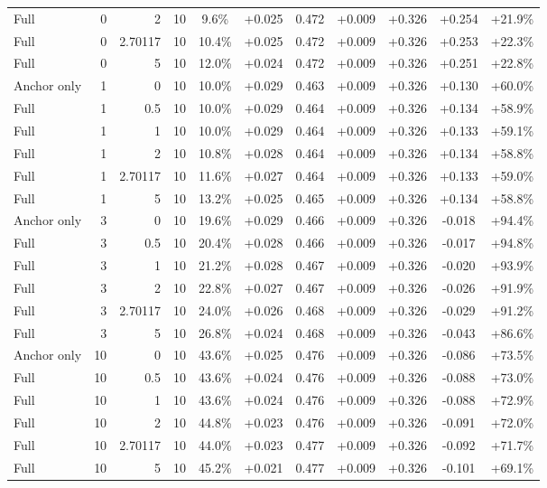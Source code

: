 \begin{table}[htbp]
\begin{tabular}{lrrrccccccc}
Full & 0 & 2 & 10 & 9.6\% & +0.025 & 0.472 & +0.009 & +0.326 & +0.254 & +21.9\% \\
Full & 0 & 2.70117 & 10 & 10.4\% & +0.025 & 0.472 & +0.009 & +0.326 & +0.253 & +22.3\% \\
Full & 0 & 5 & 10 & 12.0\% & +0.024 & 0.472 & +0.009 & +0.326 & +0.251 & +22.8\% \\
Anchor only & 1 & 0 & 10 & 10.0\% & +0.029 & 0.463 & +0.009 & +0.326 & +0.130 & +60.0\% \\
Full & 1 & 0.5 & 10 & 10.0\% & +0.029 & 0.464 & +0.009 & +0.326 & +0.134 & +58.9\% \\
Full & 1 & 1 & 10 & 10.0\% & +0.029 & 0.464 & +0.009 & +0.326 & +0.133 & +59.1\% \\
Full & 1 & 2 & 10 & 10.8\% & +0.028 & 0.464 & +0.009 & +0.326 & +0.134 & +58.8\% \\
Full & 1 & 2.70117 & 10 & 11.6\% & +0.027 & 0.464 & +0.009 & +0.326 & +0.133 & +59.0\% \\
Full & 1 & 5 & 10 & 13.2\% & +0.025 & 0.465 & +0.009 & +0.326 & +0.134 & +58.8\% \\
Anchor only & 3 & 0 & 10 & 19.6\% & +0.029 & 0.466 & +0.009 & +0.326 & -0.018 & +94.4\% \\
Full & 3 & 0.5 & 10 & 20.4\% & +0.028 & 0.466 & +0.009 & +0.326 & -0.017 & +94.8\% \\
Full & 3 & 1 & 10 & 21.2\% & +0.028 & 0.467 & +0.009 & +0.326 & -0.020 & +93.9\% \\
Full & 3 & 2 & 10 & 22.8\% & +0.027 & 0.467 & +0.009 & +0.326 & -0.026 & +91.9\% \\
Full & 3 & 2.70117 & 10 & 24.0\% & +0.026 & 0.468 & +0.009 & +0.326 & -0.029 & +91.2\% \\
Full & 3 & 5 & 10 & 26.8\% & +0.024 & 0.468 & +0.009 & +0.326 & -0.043 & +86.6\% \\
Anchor only & 10 & 0 & 10 & 43.6\% & +0.025 & 0.476 & +0.009 & +0.326 & -0.086 & +73.5\% \\
Full & 10 & 0.5 & 10 & 43.6\% & +0.024 & 0.476 & +0.009 & +0.326 & -0.088 & +73.0\% \\
Full & 10 & 1 & 10 & 43.6\% & +0.024 & 0.476 & +0.009 & +0.326 & -0.088 & +72.9\% \\
Full & 10 & 2 & 10 & 44.8\% & +0.023 & 0.476 & +0.009 & +0.326 & -0.091 & +72.0\% \\
Full & 10 & 2.70117 & 10 & 44.0\% & +0.023 & 0.477 & +0.009 & +0.326 & -0.092 & +71.7\% \\
Full & 10 & 5 & 10 & 45.2\% & +0.021 & 0.477 & +0.009 & +0.326 & -0.101 & +69.1\% \\

\end{tabular}
\end{table}

